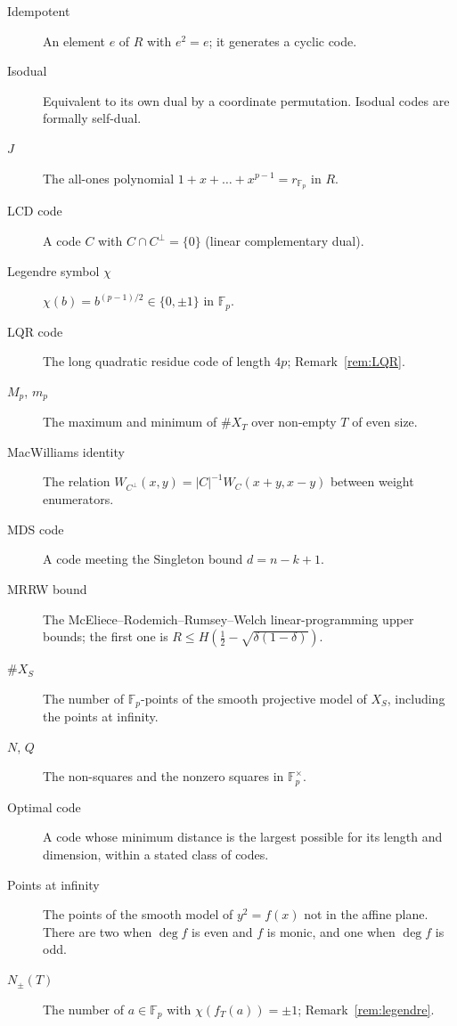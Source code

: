 \documentclass[12pt,letterpaper]{article}
\theoremstyle{definition}
\theoremstyle{remark}
\numberwithin{equation}{section}
\newcommand{\Fp}{\mathbb{F}_p}
\newcommand{\X}{\#X}
\begin{document}
\begin{description}
\item[Idempotent] An element $e$ of $R$ with $e^2=e$; it generates a cyclic code.

\item[Isodual] Equivalent to its own dual by a coordinate permutation. Isodual
codes are formally self-dual.

\item[$J$] The all-ones polynomial $1+x+\dots+x^{p-1}=r_{\Fp}$ in $R$.

\item[LCD code] A code $C$ with $C\cap C^\perp=\{0\}$ (linear complementary dual).

\item[Legendre symbol $\chi$] $\chi(b)=b^{(p-1)/2}\in\{0,\pm1\}$ in $\Fp$.

\item[LQR code] The long quadratic residue code of length $4p$; Remark~\ref{rem:LQR}.

\item[$M_p$, $m_p$] The maximum and minimum of $\X_T$ over non-empty $T$ of even
size.

\item[MacWilliams identity] The relation $W_{C^\perp}(x,y)=|C|^{-1}W_C(x+y,x-y)$
between weight enumerators.

\item[MDS code] A code meeting the Singleton bound $d=n-k+1$.

\item[MRRW bound] The McEliece--Rodemich--Rumsey--Welch linear-programming upper
bounds; the first one is $R\le H(\frac12-\sqrt{\delta(1-\delta)})$.

\item[$\#X_S$] The number of $\Fp$-points of the smooth projective model of $X_S$,
including the points at infinity.

\item[$N$, $Q$] The non-squares and the nonzero squares in $\Fp^\times$.

\item[Optimal code] A code whose minimum distance is the largest possible for its
length and dimension, within a stated class of codes.

\item[Points at infinity] The points of the smooth model of $y^2=f(x)$ not in the
affine plane. There are two when $\deg f$ is even and $f$ is monic, and one when
$\deg f$ is odd.

\item[$N_\pm(T)$] The number of $a\in\Fp$ with $\chi(f_T(a))=\pm1$;
Remark~\ref{rem:legendre}.


\end{description}
\end{document}
